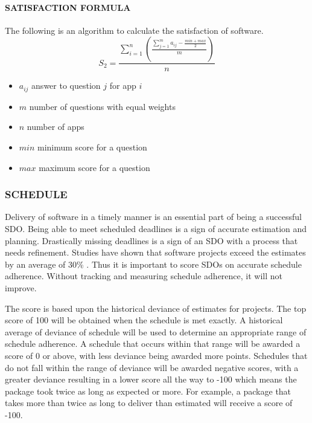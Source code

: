 \documentclass[SDSUThesis.tex]{subfiles}
\begin{document}
            \paragraph{SATISFACTION FORMULA}
            
            
            The following is an algorithm to calculate the satisfaction of software.
            \[
                S_2 = \frac{\sum^n_{i=1}\left( \frac{\sum^m_{j=1}a_{ij}- \frac{min + max}{2}}{m}  \right)}{n}
            \]
            
            \begin{itemize}
            \item $a_{i j}$ answer to question $j$ for app $i$
            \item $m$ number of questions with equal weights
            \item $n$ number of apps
            \item $min$ minimum score for a question
            \item $max$ maximum score for a question
            \end{itemize}
            
            


        \subsubsection{SCHEDULE}  
            Delivery of software in a timely manner is an essential part of being a 
            successful SDO.  Being able to meet scheduled deadlines is a sign of accurate
            estimation and planning.  Drastically missing deadlines is a sign of an SDO
            with a process that needs refinement.  Studies have shown that 
            software projects exceed the estimates by an average of
            30\% \cite{Jorgensen2014}.  Thus it is important to score SDOs on accurate
            schedule adherence. Without tracking and measuring schedule adherence, it will
            not improve.  
            
            The score is based upon the historical deviance of estimates for
            projects.  The top score of
            100 will be obtained when the schedule is met exactly.  A historical average 
            of deviance of schedule will be used to determine an appropriate range
            of schedule adherence.  A schedule that occurs within that range will be awarded
            a score of 0 or above, with less deviance being awarded more points.  Schedules
            that do not fall within the range of deviance will be awarded negative scores, 
            with a greater deviance resulting in a lower score all the way to -100 which means
            the package took twice as long as expected or more.
            For example, a package that takes more than twice as long to deliver than
            estimated will receive a score of -100.
            
\end{document}
